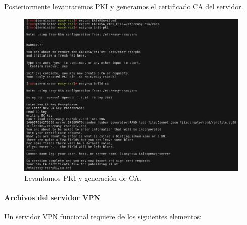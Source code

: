 \documentclass[a4paper, 11pt, titlepage]{article}
\begin{document}
            Posteriormente levantaremos PKI y generamos el certificado CA del servidor.
        
            \begin{figure}[htp]
                \centering
                \includegraphics[width=1\textwidth]{resources/ca05.png}
                \caption{Levantamos PKI y generación de CA.}
                \label{ca05}
            \end{figure}
        
            \paragraph{Archivos del servidor VPN}
        
            Un servidor VPN funcional requiere de los siguientes elementos:
        
\end{document}
